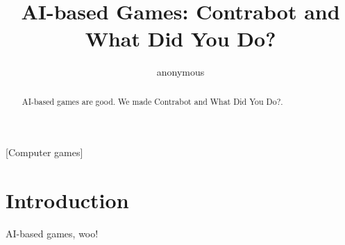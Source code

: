 \documentclass{sig-alternate}
\begin{document}

\title{AI-based Games: Contrabot and What Did You Do?}


\author{
\alignauthor
anonymous
}

\toappear{}

\maketitle
\begin{abstract}
AI-based games are good.
We made {\sc Contrabot} and {\sc What Did You Do?}.
\end{abstract}

[Computer games]




\section{Introduction}

\noindent AI-based games, woo!

\cite{smith2012:endlessweb}



\end{document}
